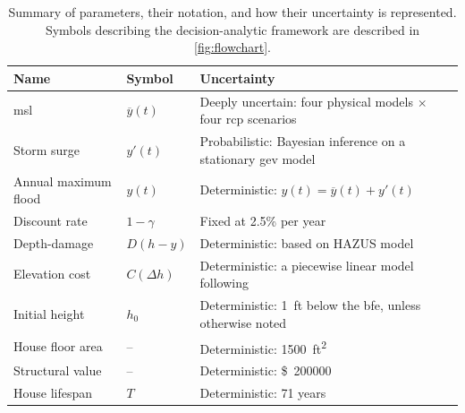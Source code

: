 \documentclass[11pt]{article}
\newcommand{\usd}[1]{\SI{#1}[\$]{}}
\begin{document}
\begin{table}
    \centering
    \caption{
        Summary of parameters, their notation, and how their uncertainty is represented.
        Symbols describing the decision-analytic framework are described in \cref{fig:flowchart}.
    }\label{tab:uncertainties}
    \footnotesize
    \begin{tabular}{p{1.25in} p{0.75in} p{3in}}
        \toprule
        Name                 & Symbol            & Uncertainty                                                                          \\
        \midrule
        \Gls{msl}            & $\overline{y}(t)$ & Deeply uncertain: four physical models $\times$ four \acrshort{rcp} scenarios        \\
        Storm surge          & $y'(t)$           & Probabilistic: Bayesian inference on a stationary \acrshort{gev} model               \\
        Annual maximum flood & $y(t)$            & Deterministic: $y(t)=\overline{y}(t)+y'(t)$                                          \\
        Discount rate        & $1-\gamma$        & Fixed at 2.5\% per year                                                              \\
        Depth-damage         & $D(h-y)$          & Deterministic: based on HAZUS model \citep[see][]{zarekarizi_suboptimal:2020}        \\
        Elevation cost       & $C(\Delta h)$     & Deterministic: a piecewise linear model following \citet{zarekarizi_suboptimal:2020} \\
        Initial height       & $h_0$             & Deterministic: \SI{1}{ft} below the \gls{bfe}, unless otherwise noted                \\
        House floor area     & --                & Deterministic: \SI{1500}{ft^2}                                                       \\
        Structural value     & --                & Deterministic: \usd{200000}                                                          \\
        House lifespan       & $T$               & Deterministic: 71 years                                                              \\
        \bottomrule
    \end{tabular}
\end{table}
\end{document}
